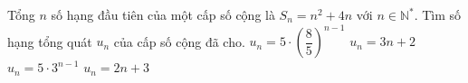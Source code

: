 \begin{ex}%
	Tổng $n$ số hạng đầu tiên của một cấp  số cộng là ${{S}_{n}}={{n}^2}+4n$ với $n\in {{\mathbb{N}}^{*}}$. Tìm số hạng tổng quát ${{u}_{n}}$ của cấp số cộng đã cho.
	 \choice
		 { ${{u}_{n}}=5\cdot {{\left(\dfrac{8}{5} \right)}^{n-1}}$}
		{ ${{u}_{n}}=3n+2$} 
		{ ${{u}_{n}}={{5\cdot  3}^{n-1}}$}
		{  \True ${{u}_{n}}=2n+3$}
\end{ex}
